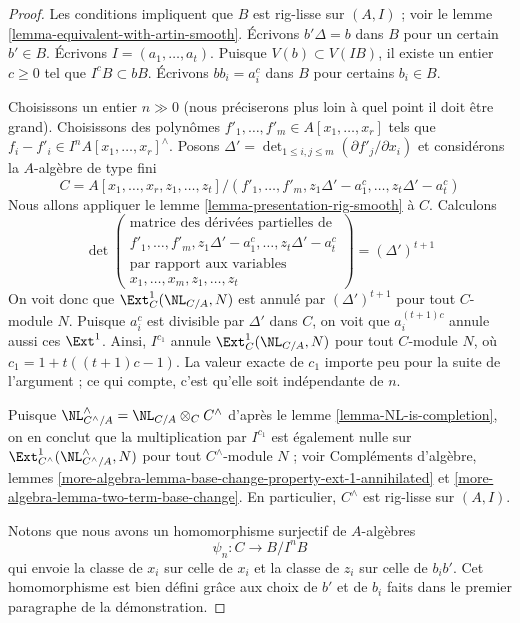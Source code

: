 \begin{proof}
Les conditions impliquent que $B$ est rig-lisse sur $(A, I)$ ; voir le lemme
\ref{lemma-equivalent-with-artin-smooth}. Écrivons $b' \Delta = b$ dans $B$
pour un certain $b' \in B$. Écrivons $I = (a_1, \ldots, a_t)$. Puisque
$V(b) \subset V(IB)$, il existe un entier $c \geq 0$ tel que
$I^cB \subset bB$. Écrivons $bb_i = a_i^c$ dans $B$ pour certains $b_i \in B$.

\medskip\noindent
Choisissons un entier $n \gg 0$ (nous préciserons plus loin à quel point il
doit être grand). Choisissons des polynômes
$f'_1, \ldots, f'_m \in A[x_1, \ldots, x_r]$ tels que
$f_i - f'_i \in I^nA[x_1, \ldots, x_r]^\wedge$. Posons
$\Delta' = \det_{1 \leq i, j \leq m}(\partial f'_j/\partial x_i)$ et
considérons la $A$-algèbre de type fini
$$
C = A[x_1, \ldots, x_r, z_1, \ldots, z_t]/
(f'_1, \ldots, f'_m,
z_1\Delta' - a_1^c, \ldots, z_t\Delta' - a_t^c)
$$
Nous allons appliquer le lemme \ref{lemma-presentation-rig-smooth} à $C$.
Calculons
$$
\det\left(
\begin{matrix}
\text{matrice des dérivées partielles de} \\
f'_1, \ldots, f'_m, z_1\Delta' - a_1^c, \ldots, z_t\Delta' - a_t^c \\
\text{par rapport aux variables} \\
x_1, \ldots, x_m, z_1, \ldots, z_t
\end{matrix}
\right) =
(\Delta')^{t + 1}
$$
On voit donc que $\Ext^1_C(\NL_{C/A}, N)$ est annulé par
$(\Delta')^{t + 1}$ pour tout $C$-module $N$. Puisque $a_i^c$ est divisible
par $\Delta'$ dans $C$, on voit que $a_i^{(t + 1)c}$ annule aussi ces
$\Ext^1$. Ainsi, $I^{c_1}$ annule $\Ext^1_C(\NL_{C/A}, N)$ pour tout
$C$-module $N$, où $c_1 = 1 + t((t + 1)c - 1)$. La valeur exacte de $c_1$
importe peu pour la suite de l'argument ; ce qui compte, c'est qu'elle soit
indépendante de $n$.

\medskip\noindent
Puisque $\NL_{C^\wedge/A}^\wedge = \NL_{C/A} \otimes_C C^\wedge$ d'après le
lemme \ref{lemma-NL-is-completion}, on en conclut que la multiplication par
$I^{c_1}$ est également nulle sur
$\Ext^1_{C^\wedge}(\NL_{C^\wedge/A}^\wedge, N)$ pour tout $C^\wedge$-module
$N$ ; voir Compléments d'algèbre, lemmes
\ref{more-algebra-lemma-base-change-property-ext-1-annihilated} et
\ref{more-algebra-lemma-two-term-base-change}. En particulier, $C^\wedge$ est
rig-lisse sur $(A, I)$.

\medskip\noindent
Notons que nous avons un homomorphisme surjectif de $A$-algèbres
$$
\psi_n : C \longrightarrow B/I^nB
$$
qui envoie la classe de $x_i$ sur celle de $x_i$ et la classe de $z_i$ sur
celle de $b_ib'$. Cet homomorphisme est bien défini grâce aux choix de $b'$ et
de $b_i$ faits dans le premier paragraphe de la démonstration.


\end{proof}

